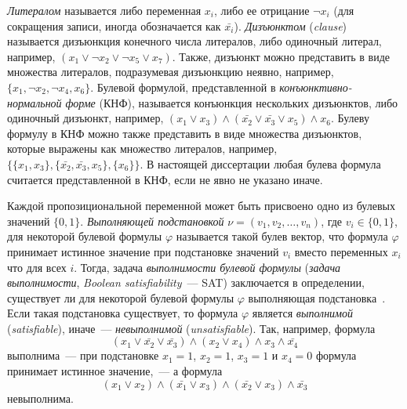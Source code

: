 \emph{Литералом} называется либо переменная $x_{i}$, либо ее отрицание $\neg x_{i}$ (для сокращения записи, иногда обозначается как $\bar{x_{i}}$).
\emph{Дизъюнктом} (\emph{clause}) называется дизъюнкция конечного числа литералов, либо одиночный литерал, например, $\left(x_{1} \vee \neg x_{2} \vee \neg x_{5} \vee x_{7}\right)$.
Также, дизъюнкт можно представить в виде множества литералов, подразумевая дизъюнкцию неявно, например, $\{x_{1}, \neg x_{2}, \neg x_{4}, x_{6}\}$.
Булевой формулой, представленной в \emph{конъюнктивно-нормальной форме} (КНФ), называется конъюнкция нескольких дизъюнктов, либо одиночный дизъюнкт, например, $\left(x_{1} \vee x_{3}\right) \wedge \left(\bar{x_{2}} \vee \bar{x_{3}} \vee x_{5}\right) \wedge x_{6}$.
Булеву формулу в КНФ можно также представить в виде множества дизъюнктов, которые выражены как множество литералов, например, $\{\{x_{1},x_{3}\}, \{\bar{x_{2}}, \bar{x_{3}}, x_{5}\}, \{x_{6}\}\}$.
В настоящей диссертации любая булева формула считается представленной в КНФ, если не явно не указано иначе.

Каждой пропозициональной переменной может быть присвоено одно из булевых значений $\{0, 1\}$.
\emph{Выполняющей подстановкой} $\nu = \left(v_{1},v_{2},\ldots,v_{n}\right)$, где $v_{i} \in \{0,1\}$, для некоторой булевой формулы $\varphi$ называется такой булев вектор, что формула $\varphi$ принимает истинное значение при подстановке значений $v_{i}$ вместо переменных $x_{i}$ что для всех $i$.
Тогда, задача \emph{выполнимости булевой формулы} (\emph{задача выполнимости}, \emph{Boolean satisfiability}~--- SAT) заключается в определении, существует ли для некоторой булевой формулы $\varphi$ выполняющая подстановка~\cite{SAThandbook-2009}.
Если такая подстановка существует, то формула $\varphi$ является \emph{выполнимой} (\emph{satisfiable}), иначе~--- \emph{невыполнимой} (\emph{unsatisfiable}). 
Так, например, формула
\begin{equation*}
\left(x_{1}\vee \bar{x_{2}} \vee \bar{x_{3}}\right) \wedge \left(x_{2} \vee x_{4}\right) \wedge x_{3} \wedge \bar{x_{4}}
\end{equation*}
выполнима~--- при подстановке $x_{1} = 1$, $x_{2} = 1$, $x_{3} = 1$ и $x_{4} = 0$ формула принимает истинное значение,~--- а формула
\begin{equation*}
\left(x_{1} \vee x_{2}\right) \wedge \left(\bar{x_{1}} \vee x_{3}\right) \wedge \left(\bar{x_{2}} \vee x_{3}\right) \wedge \bar{x_{3}}
\end{equation*}
невыполнима.

